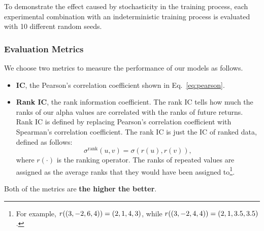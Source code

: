 To demonstrate the effect caused by stochasticity in the training process, each experimental combination with an indeterministic training process is evaluated with 10 different random seeds.

\subsubsection{Evaluation Metrics}

We choose two metrics to measure the performance of our models as follows.

\begin{itemize}
    \item \textbf{IC}, the Pearson's correlation coefficient shown in Eq.~\ref{eq:pearson}.
    \item \textbf{Rank IC}, the rank information coefficient. The rank IC tells how much the ranks of our alpha values are correlated with the ranks of future returns. Rank IC is defined by replacing Pearson's correlation coefficient with Spearman's correlation coefficient. The rank IC is just the IC of ranked data, defined as follows:
          \begin{equation}
              \sigma^{\mathrm{rank}}(u, v) = \sigma(r(u), r(v)),
          \end{equation}
          where $r(\cdot)$ is the ranking operator. The ranks of repeated values are assigned as the average ranks that they would have been assigned to\footnote{For example, $r(\left(3, -2, 6, 4\right)) = \left(2, 1, 4, 3\right)$, while $r((3, -2, 4, 4)) = \left(2, 1, 3.5, 3.5\right)$.}.
\end{itemize}

Both of the metrics are \textbf{the higher the better}.

